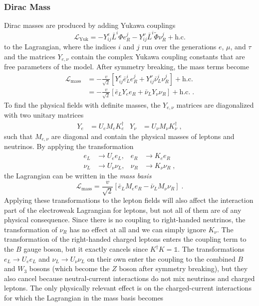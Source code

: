 \subsubsection{Dirac Mass}

Dirac masses are produced by adding Yukawa couplings
\begin{equation}
    \mathcal{L}_\mathrm{Yuk} = -Y_{ij}^e \bar{L}^i \Phi e_R^j - Y_{ij}^\nu \bar{L}^i \tilde{\Phi} \nu_R^j + \mathrm{h.c.}
\end{equation}
to the Lagrangian, where the indices $i$ and $j$ run over the generations $e$, $\mu$, and $\tau$ and the matrices $Y_{e,\nu}$ contain the complex Yukawa coupling constants that are free parameters of the model. After symmetry breaking, the mass terms become
\begin{equation}
\begin{aligned}
  \mathcal{L}_\mathrm{mass} &= -\frac{v}{\sqrt{2}}\left[  Y^e_{ij} \bar{e}_L^i e_R^j +  Y^\nu_{ij} \bar{\nu}_L^i \nu_R^j \right] + \mathrm{h.c.} \\
  &=  -\frac{v}{\sqrt{2}}\left[ \bar{e}_L Y_e e_R + \bar{\nu}_L Y_\nu \nu_R \right] + \mathrm{h.c.}\;.
\end{aligned}
\end{equation}
To find the physical fields with definite masses, the $Y_{e,\nu}$ matrices are diagonalized with two unitary matrices
\begin{align}
    Y_e &= U_e M_e K_e^\dag &Y_\nu &= U_\nu M_\nu K_\nu^\dag\;,
\end{align}
such that $M_{e,\nu}$ are diagonal and contain the physical masses of leptons and neutrinos. By applying the transformation
\begin{equation}
\begin{aligned}
    e_L &\rightarrow U_e e_L, &e_R &\rightarrow K_e e_R \\
    \nu_L &\rightarrow U_\nu \nu_L, &\nu_R &\rightarrow K_\nu \nu_R\;, \label{eq:mass-basis-trafo}
\end{aligned}
\end{equation}
the Lagrangian can be written in the \emph{mass basis}
\begin{equation}
    \mathcal{L}_\mathrm{mass} = \frac{v}{\sqrt{2}} \left[ \bar{e}_L M_e e_R - \bar{\nu}_L M_\nu \nu_R \right]\;.
\end{equation}
Applying these transformations to the lepton fields will also affect the interaction part of the electroweak Lagrangian for leptons, but not all of them are of any physical consequence. Since there is no coupling to right-handed neutrinos, the transformation of $\nu_R$ has no effect at all and we can simply ignore $K_\nu$. The transformation of the right-handed charged leptons enters the coupling term to the $B$ gauge boson, but it exactly cancels since $K^\dag K = \mathbb{1}$. The transformations $e_L \rightarrow U_e e_L$ and $\nu_L \rightarrow U_\nu \nu_L$ on their own enter the coupling to the combined $B$ and $W_3$ bosons (which become the $Z$ boson after symmetry breaking), but they also cancel because neutral-current interactions do not mix neutrinos and charged leptons. The only physically relevant effect is on the charged-current interactions for which the Lagrangian in the mass basis becomes
